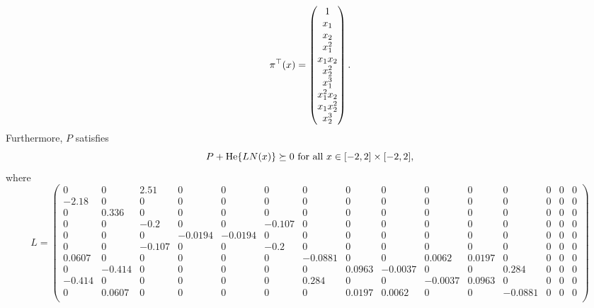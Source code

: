 \documentclass[fleqn]{article}
\begin{document}
\begin{equation}
    \pi^\top(x) = \pmqty{ 1 \\ x_{1} \\ x_{2} \\ x_{1}^2 \\ x_{1}x_{2} \\ x_{2}^2 \\ x_{1}^3 \\ x_{1}^2x_{2} \\ x_{1}x_{2}^2 \\ x_{2}^3 }.
\end{equation}
Furthermore, $P$ satisfies
\begin{equation}
    P + \He{L N(x)} \succeq 0 \text{ for all } x \in [-2,2] \times [-2,2],
\end{equation}
where
\begin{equation}
    L = \left(\begin{smallmatrix}
        0        & 0        & 2.51     & 0        & 0        & 0        & 0        & 0        & 0        & 0        & 0        & 0        & 0        & 0        & 0        \\
        -2.18    & 0        & 0        & 0        & 0        & 0        & 0        & 0        & 0        & 0        & 0        & 0        & 0        & 0        & 0        \\
        0        & 0.336    & 0        & 0        & 0        & 0        & 0        & 0        & 0        & 0        & 0        & 0        & 0        & 0        & 0        \\
        0        & 0        & -0.2     & 0        & 0        & -0.107   & 0        & 0        & 0        & 0        & 0        & 0        & 0        & 0        & 0        \\
        0        & 0        & 0        & -0.0194  & -0.0194  & 0        & 0        & 0        & 0        & 0        & 0        & 0        & 0        & 0        & 0        \\
        0        & 0        & -0.107   & 0        & 0        & -0.2     & 0        & 0        & 0        & 0        & 0        & 0        & 0        & 0        & 0        \\
        0.0607   & 0        & 0        & 0        & 0        & 0        & -0.0881  & 0        & 0        & 0.0062   & 0.0197   & 0        & 0        & 0        & 0        \\
        0        & -0.414   & 0        & 0        & 0        & 0        & 0        & 0.0963   & -0.0037  & 0        & 0        & 0.284    & 0        & 0        & 0        \\
        -0.414   & 0        & 0        & 0        & 0        & 0        & 0.284    & 0        & 0        & -0.0037  & 0.0963   & 0        & 0        & 0        & 0        \\
        0        & 0.0607   & 0        & 0        & 0        & 0        & 0        & 0.0197   & 0.0062   & 0        & 0        & -0.0881  & 0        & 0        & 0        \\
    \end{smallmatrix}\right)
\end{equation}



\end{document}
